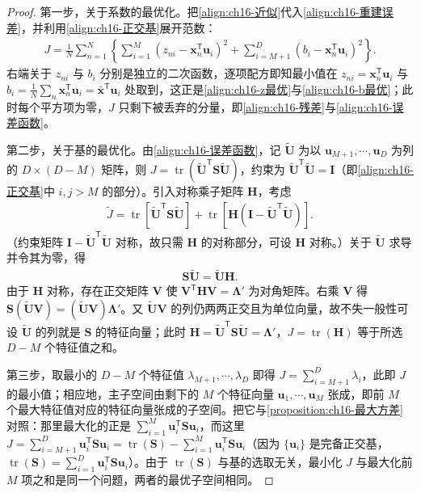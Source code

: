 \documentclass[../../main.tex]{subfiles}
\begin{document}
\begin{proof}
第一步，关于系数的最优化。把\eqref{align:ch16-近似}代入\eqref{align:ch16-重建误差}，并利用\eqref{align:ch16-正交基}展开范数：
\begin{align*}
  J=\frac{1}{N}\sum_{n=1}^{N}\left\{\sum_{i=1}^{M}\left(z_{ni}-\bm{x}_n^{\mathsf T}\bm{u}_i\right)^2+\sum_{i=M+1}^{D}\left(b_i-\bm{x}_n^{\mathsf T}\bm{u}_i\right)^2\right\}.
\end{align*}
右端关于 $z_{ni}$ 与 $b_i$ 分别是独立的二次函数，逐项配方即知最小值在 $z_{ni}=\bm{x}_n^{\mathsf T}\bm{u}_i$ 与 $b_i=\frac{1}{N}\sum_n\bm{x}_n^{\mathsf T}\bm{u}_i=\bar{\bm{x}}^{\mathsf T}\bm{u}_i$ 处取到，这正是\eqref{align:ch16-z最优}与\eqref{align:ch16-b最优}；此时每个平方项为零，$J$ 只剩下被丢弃的分量，即\eqref{align:ch16-残差}与\eqref{align:ch16-误差函数}。

第二步，关于基的最优化。由\eqref{align:ch16-误差函数}，记 $\tilde{\bm{U}}$ 为以 $\bm{u}_{M+1},\cdots,\bm{u}_D$ 为列的 $D\times(D-M)$ 矩阵，则 $J=\operatorname{tr}(\tilde{\bm{U}}^{\mathsf T}\bm{S}\tilde{\bm{U}})$，约束为 $\tilde{\bm{U}}^{\mathsf T}\tilde{\bm{U}}=\bm{I}$（即\eqref{align:ch16-正交基}中 $i,j>M$ 的部分）。引入对称乘子矩阵 $\bm{H}$，考虑
\begin{align}
  \tilde{J}=\operatorname{tr}\left[\tilde{\bm{U}}^{\mathsf T}\bm{S}\tilde{\bm{U}}\right]+\operatorname{tr}\left[\bm{H}\left(\bm{I}-\tilde{\bm{U}}^{\mathsf T}\tilde{\bm{U}}\right)\right].
  \label{align:ch16-误差矩阵形式}
\end{align}
（约束矩阵 $\bm{I}-\tilde{\bm{U}}^{\mathsf T}\tilde{\bm{U}}$ 对称，故只需 $\bm{H}$ 的对称部分，可设 $\bm{H}$ 对称。）关于 $\tilde{\bm{U}}$ 求导并令其为零，得
\begin{align*}
  \bm{S}\tilde{\bm{U}}=\tilde{\bm{U}}\bm{H}.
\end{align*}
由于 $\bm{H}$ 对称，存在正交矩阵 $\bm{V}$ 使 $\bm{V}^{\mathsf T}\bm{H}\bm{V}=\bm{\Lambda}'$ 为对角矩阵。右乘 $\bm{V}$ 得 $\bm{S}(\tilde{\bm{U}}\bm{V})=(\tilde{\bm{U}}\bm{V})\bm{\Lambda}'$。又 $\tilde{\bm{U}}\bm{V}$ 的列仍两两正交且为单位向量，故不失一般性可设 $\tilde{\bm{U}}$ 的列就是 $\bm{S}$ 的特征向量；此时 $\bm{H}=\tilde{\bm{U}}^{\mathsf T}\bm{S}\tilde{\bm{U}}=\bm{\Lambda}'$，$J=\operatorname{tr}(\bm{H})$ 等于所选 $D-M$ 个特征值之和。

第三步，取最小的 $D-M$ 个特征值 $\lambda_{M+1},\cdots,\lambda_D$ 即得 $J=\sum_{i=M+1}^{D}\lambda_i$，此即 $J$ 的最小值；相应地，主子空间由剩下的 $M$ 个特征向量 $\bm{u}_1,\cdots,\bm{u}_M$ 张成，即前 $M$ 个最大特征值对应的特征向量张成的子空间。把它与\cref{proposition:ch16-最大方差}对照：那里最大化的正是 $\sum_{i=1}^{M}\bm{u}_i^{\mathsf T}\bm{S}\bm{u}_i$，而这里 $J=\sum_{i=M+1}^{D}\bm{u}_i^{\mathsf T}\bm{S}\bm{u}_i=\operatorname{tr}(\bm{S})-\sum_{i=1}^{M}\bm{u}_i^{\mathsf T}\bm{S}\bm{u}_i$（因为 $\{\bm{u}_i\}$ 是完备正交基，$\operatorname{tr}(\bm{S})=\sum_{i=1}^{D}\bm{u}_i^{\mathsf T}\bm{S}\bm{u}_i$）。由于 $\operatorname{tr}(\bm{S})$ 与基的选取无关，最小化 $J$ 与最大化前 $M$ 项之和是同一个问题，两者的最优子空间相同。
\end{proof}
\end{document}
